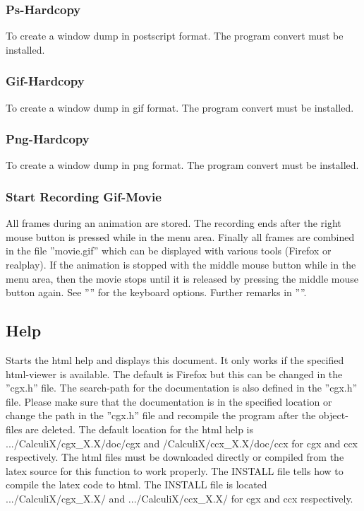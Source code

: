 \documentclass{article}
\begin{document}
\subsubsection{\label{Ps-Hardcopy}Ps-Hardcopy}
To create a window dump in postscript format. The program convert must be installed.

\subsubsection{\label{Gif-Hardcopy}Gif-Hardcopy}
To create a window dump in gif format. The program convert must be installed.

\subsubsection{\label{Png-Hardcopy}Png-Hardcopy}
To create a window dump in png format. The program convert must be installed.

\subsubsection{\label{Start Recording Gif-Movie}Start Recording Gif-Movie}
All frames during an animation are stored. The recording ends after the right mouse button is pressed while in the menu area. Finally all frames are combined in the file ''movie.gif'' which can be displayed with various tools (Firefox \cite{Firefox} or realplay). If the animation is stopped with the middle mouse button while in the menu area, then the movie stops until it is released by pressing the middle mouse button again. See '''' for the keyboard options. Further remarks in ''''.

\subsection{\label{Help}Help}
Starts the html help and displays this document. It only works if the specified html-viewer is available. The default is Firefox \cite{Firefox} but this can be changed in the ''cgx.h'' file. The search-path for the documentation is also defined in the ''cgx.h'' file. Please make sure that the documentation is in the specified location or change the path in the ''cgx.h'' file and recompile the program after the object-files are deleted.  The default location for the html help is .../CalculiX/cgx\_X.X/doc/cgx and /CalculiX/ccx\_X.X/doc/ccx for cgx and ccx respectively.  The html files must be downloaded directly or compiled from the latex source for this function to work properly. The INSTALL file tells how to compile the latex code to html.  The INSTALL file is located .../CalculiX/cgx\_X.X/ and .../CalculiX/ccx\_X.X/ for cgx and ccx respectively.
\end{document}
